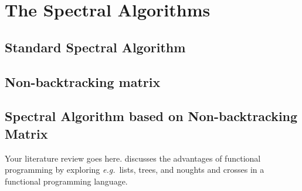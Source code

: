 \chapter{The Spectral Algorithms}
\section{Standard Spectral Algorithm}
\section{Non-backtracking matrix}
\section{Spectral Algorithm based on Non-backtracking Matrix}
\label{sec: Spectral Algorithm based on Non-backtracking Matrix}

Your literature review goes here.  discusses the advantages of functional programming by exploring \emph{e.g.}\ lists, trees, and noughts and crosses in a functional programming language. 
